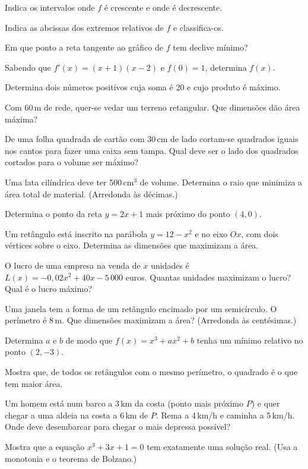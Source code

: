 \documentclass[12pt]{article}
\begin{document}
\begin{exercicios}
  \item Indica os intervalos onde $f$ é crescente e onde é decrescente.
  \item Indica as abcissas dos extremos relativos de $f$ e classifica-os.
  \item Em que ponto a reta tangente ao gráfico de $f$ tem declive mínimo?
  \item Sabendo que $f'(x) = (x + 1)(x - 2)$ e $f(0) = 1$, determina $f(x)$.
\end{exercicios}

\begin{exercicios}
  \item Determina dois números positivos cuja soma é 20 e cujo produto é máximo.
  \item Com 60\,m de rede, quer-se vedar um terreno retangular. Que dimensões dão área máxima?
  \item De uma folha quadrada de cartão com 30\,cm de lado cortam-se quadrados iguais nos cantos para fazer uma caixa sem tampa. Qual deve ser o lado dos quadrados cortados para o volume ser máximo?
  \item Uma lata cilíndrica deve ter 500\,cm$^3$ de volume. Determina o raio que minimiza a área total de material. (Arredonda às décimas.)
  \item Determina o ponto da reta $y = 2x + 1$ mais próximo do ponto $(4, 0)$.
  \item Um retângulo está inscrito na parábola $y = 12 - x^2$ e no eixo $Ox$, com dois vértices sobre o eixo. Determina as dimensões que maximizam a área.
  \item O lucro de uma empresa na venda de $x$ unidades é $L(x) = -0{,}02x^2 + 40x - 5\,000$ euros. Quantas unidades maximizam o lucro? Qual é o lucro máximo?
  \item Uma janela tem a forma de um retângulo encimado por um semicírculo. O perímetro é 8\,m. Que dimensões maximizam a área? (Arredonda às centésimas.)
\end{exercicios}

\begin{exercicios}
  \item Determina $a$ e $b$ de modo que $f(x) = x^3 + ax^2 + b$ tenha um mínimo relativo no ponto $(2, -3)$.
  \item Mostra que, de todos os retângulos com o mesmo perímetro, o quadrado é o que tem maior área.
  \item Um homem está num barco a 3\,km da costa (ponto mais próximo $P$) e quer chegar a uma aldeia na costa a 6\,km de $P$. Rema a 4\,km/h e caminha a 5\,km/h. Onde deve desembarcar para chegar o mais depressa possível?
  \item Mostra que a equação $x^3 + 3x + 1 = 0$ tem exatamente uma solução real. (Usa a monotonia e o teorema de Bolzano.)
\end{exercicios}
\end{document}
